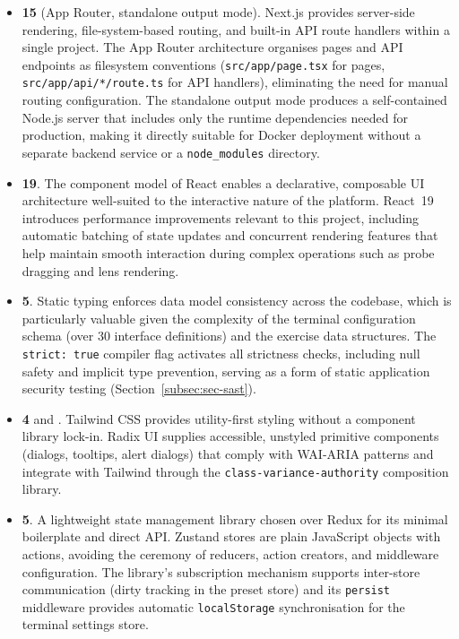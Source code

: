 \begin{itemize}
    \item \textbf{\nextjs{} 15} (App Router, standalone output mode). Next.js provides server-side rendering, file-system-based routing, and built-in API route handlers within a single project. The App Router architecture organises pages and API endpoints as filesystem conventions (\texttt{src/app/page.tsx} for pages, \texttt{src/app/api/*/route.ts} for API handlers), eliminating the need for manual routing configuration. The standalone output mode produces a self-contained Node.js server that includes only the runtime dependencies needed for production, making it directly suitable for Docker deployment without a separate backend service or a \texttt{node\_modules} directory.

    \item \textbf{\reactjs{} 19}. The component model of React enables a declarative, composable UI architecture well-suited to the interactive nature of the platform. React~19 introduces performance improvements relevant to this project, including automatic batching of state updates and concurrent rendering features that help maintain smooth interaction during complex operations such as probe dragging and lens rendering.

    \item \textbf{\typescript{} 5}. Static typing enforces data model consistency across the codebase, which is particularly valuable given the complexity of the terminal configuration schema (over 30 interface definitions) and the exercise data structures. The \texttt{strict: true} compiler flag activates all strictness checks, including null safety and implicit type prevention, serving as a form of static application security testing (Section~\ref{subsec:sec-sast}).

    \item \textbf{\tailwind{} 4} and \textbf{\radixui{}}. Tailwind CSS provides utility-first styling without a component library lock-in. Radix UI supplies accessible, unstyled primitive components (dialogs, tooltips, alert dialogs) that comply with WAI-ARIA patterns and integrate with Tailwind through the \texttt{class-variance-authority} composition library.

    \item \textbf{\zustand{} 5}. A lightweight state management library chosen over Redux for its minimal boilerplate and direct API. Zustand stores are plain JavaScript objects with actions, avoiding the ceremony of reducers, action creators, and middleware configuration. The library's subscription mechanism supports inter-store communication (dirty tracking in the preset store) and its \texttt{persist} middleware provides automatic \texttt{localStorage} synchronisation for the terminal settings store.


\end{itemize}
